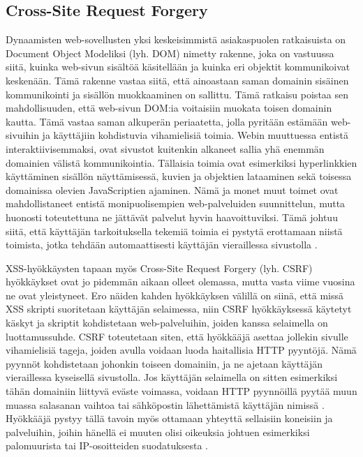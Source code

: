 \subsection{Cross-Site Request Forgery}

Dynaamisten web-sovellusten yksi keskeisimmistä asiakaspuolen ratkaisuista on Document Object Modeliksi (lyh. DOM) nimetty rakenne, joka on vastuussa siitä,
kuinka web-sivun sisältöä käsitellään ja kuinka eri objektit kommunikoivat keskenään. Tämä rakenne vastaa siitä, että ainoastaan saman domainin 
sisäinen kommunikointi ja sisällön muokkaaminen on sallittu. Tämä ratkaisu poistaa sen mahdollisuuden, että web-sivun DOM:ia voitaisiin muokata toisen
domainin kautta. Tämä vastaa saman alkuperän periaatetta, jolla pyritään estämään web-sivuihin ja käyttäjiin kohdistuvia vihamielisiä toimia.
Webin muuttuessa entistä interaktiivisemmaksi, ovat sivustot kuitenkin alkaneet sallia yhä enemmän domainien välistä kommunikointia. Tällaisia 
toimia ovat esimerkiksi hyperlinkkien käyttäminen sisällön näyttämisessä, kuvien ja objektien lataaminen sekä toisessa domainissa olevien 
JavaScriptien ajaminen. Nämä ja monet muut toimet ovat mahdollistaneet entistä monipuolisempien web-palveluiden suunnittelun, mutta huonosti toteutettuna 
ne jättävät palvelut hyvin haavoittuviksi. Tämä johtuu siitä, että käyttäjän tarkoituksella tekemiä toimia ei pystytä erottamaan niistä toimista, jotka tehdään 
automaattisesti käyttäjän vieraillessa sivustolla \cite{WEB2}.

XSS-hyökkäysten tapaan myös Cross-Site Request Forgery (lyh. CSRF) hyökkäykset ovat jo pidemmän aikaan olleet olemassa, mutta vasta viime vuosina ne
ovat yleistyneet. Ero näiden kahden hyökkäyksen välillä on siinä, että missä XSS skripti suoritetaan käyttäjän selaimessa, niin CSRF hyökkäyksessä käytetyt
käskyt ja skriptit kohdistetaan web-palveluihin, joiden kanssa selaimella on luottamussuhde. CSRF toteutetaan siten, että hyökkääjä asettaa jollekin sivulle
vihamielisiä tageja, joiden avulla voidaan luoda haitallisia HTTP pyyntöjä. Nämä pyynnöt kohdistetaan johonkin toiseen domainiin, ja ne ajetaan käyttäjän 
vieraillessa kyseisellä sivustolla. Jos käyttäjän selaimella on sitten esimerkiksi tähän domainiin liittyvä eväste voimassa, voidaan HTTP pyynnöillä pyytää muun muassa
salasanan vaihtoa tai sähköpostin lähettämistä käyttäjän nimissä \cite{WEB2b}. Hyökkääjä pystyy tällä tavoin myös ottamaan yhteyttä sellaisiin koneisiin ja palveluihin,
joihin hänellä ei muuten olisi oikeuksia johtuen esimerkiksi palomuurista tai IP-osoitteiden suodatuksesta \cite{CSRF}.

